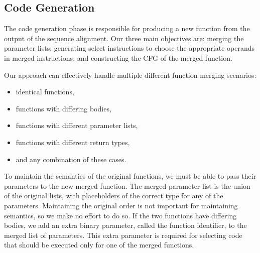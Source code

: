 

\subsection{Code Generation}
The code generation phase is responsible for producing a new function from the output of the sequence alignment.
Our three main objectives are: merging the parameter lists; generating select instructions to choose the appropriate
operands in merged instructions; and constructing the CFG of the merged function.

Our approach can effectively handle multiple different function merging scenarios:
\begin{itemize}[noitemsep,topsep=3pt]
  \item identical functions,
  \item functions with differing bodies,
  \item functions with different parameter lists, 
  \item functions with different return types,
  \item and any combination of these cases.
\end{itemize}


To maintain the semantics of the original functions, we must be able to pass their parameters to
the new merged function. The merged parameter list is the union of the original lists, with
placeholders of the correct type for any of the parameters. Maintaining the original order is not
important for maintaining semantics, so we make no effort to do so.
If the two functions have differing bodies, we add an extra binary parameter, called the function
identifier, to the merged list of parameters. This extra parameter is required for selecting code
that should be executed only for one of the merged functions.

